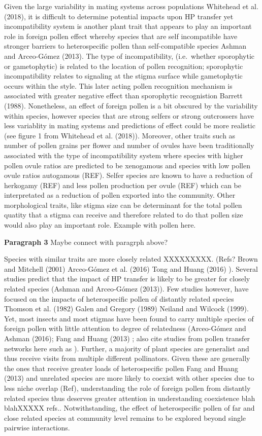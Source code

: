 \documentclass[11pt,a4paper]{article}
\begin{document}
Given the large variability in mating systems across populations
Whitehead et al. (2018), it is difficult to determine potential impacts
upon HP transfer yet incompatibility system is another plant trait that
appears to play an important role in foreign pollen effect whereby
species that are self incompatible have stronger barriers to
heterospecific pollen than self-compatible species Ashman and
Arceo-Gómez (2013). The type of incompatibility, (i.e.~whether
sporophytic or gametophytic) is related to the location of pollen
recognition; sporophytic incompatibility relates to signaling at the
stigma surface while gametophytic occurs within the style. This later
acting pollen recognition mechanism is associated with greater negative
effect than sporophytic recognistion Barrett (1988). Nonetheless, an
effect of foreign pollen is a bit obscured by the variability within
species, however species that are strong selfers or strong outcrossers
have less variablity in mating systems and predictions of effect could
be more realistic (see figure 1 from Whitehead et al. (2018)). Moreover,
other traits such as number of pollen grains per flower and number of
ovules have been traditionally associated with the type of
incompatibility system where species with higher pollen ovule ratios are
predicted to be xenogamous and species with low pollen ovule ratios
autogamous (REF). Selfer species are known to have a reduction of
herkogamy (REF) and less pollen production per ovule (REF) which can be
interpretated as a reduction of pollen exported into the community.
Other morphological traits, like stigma size can be determinant for the
total pollen quatity that a stigma can receive and therefore related to
do that pollen size would also play an important role. Example with
pollen here.

\textbf{Paragraph 3} Maybe connect with paragrph above?

Species with similar traits are more closely related XXXXXXXXX. (Refs?
Brown and Mitchell (2001) Arceo-Gómez et al. (2016) Tong and Huang
(2016) ). Several studies predict that the impact of HP transfer is
likely to be greater for closely related species (Ashman and Arceo-Gómez
(2013)). Few studies however, have focused on the impacts of
heterospecific pollen of distantly related species Thomson et al. (1982)
Galen and Gregory (1989) Neiland and Wilcock (1999). Yet, most insects
and most stigmas have been found to carry multiple species of foreign
pollen with little attention to degree of relatedness (Arceo-Gómez and
Ashman (2016); Fang and Huang (2013) ; also cite studies from pollen
transfer networks here such as ). Further, a majority of plant species
are generalist and thus receive visits from multiple different
pollinators. Given these are generally the ones that receive greater
loads of heterospecific pollen Fang and Huang (2013) and unrelated
species are more likely to coexist with other species due to less niche
overlap (Ref), understanding the role of foreign pollen from distantly
related species thus deserves greater attention in understanding
coexistence blah blahXXXXX refs.. Notwithstanding, the effect of
heterospecific pollen of far and close related species at community
level remains to be explored beyond single pairwise interactions.
\end{document}
